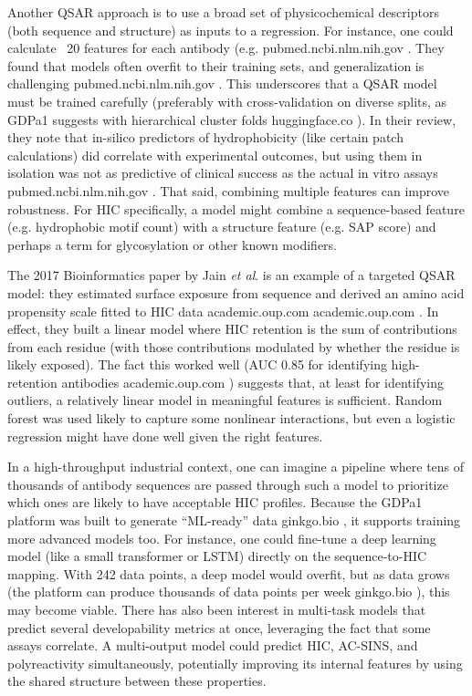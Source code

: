 \documentclass[12pt]{article}
\begin{document}
Another QSAR approach is to use a broad set of physicochemical descriptors (both sequence and structure) as inputs to a regression. For instance, one could calculate ~20 features for each antibody (e.g. %
pubmed.ncbi.nlm.nih.gov
. They found that models often overfit to their training sets, and generalization is challenging
pubmed.ncbi.nlm.nih.gov
. This underscores that a QSAR model must be trained carefully (preferably with cross-validation on diverse splits, as GDPa1 suggests with hierarchical cluster folds
huggingface.co
). In their review, they note that in-silico predictors of hydrophobicity (like certain patch calculations) did correlate with experimental outcomes, but using them in isolation was not as predictive of clinical success as the actual in vitro assays
pubmed.ncbi.nlm.nih.gov
. That said, combining multiple features can improve robustness. For HIC specifically, a model might combine a sequence-based feature (e.g. hydrophobic motif count) with a structure feature (e.g. SAP score) and perhaps a term for glycosylation or other known modifiers.

The 2017 Bioinformatics paper by Jain \textit{et al}. is an example of a targeted QSAR model: they estimated surface exposure from sequence and derived an amino acid propensity scale fitted to HIC data
academic.oup.com
academic.oup.com
. In effect, they built a linear model where HIC retention is the sum of contributions from each residue (with those contributions modulated by whether the residue is likely exposed). The fact this worked well (AUC 0.85 for identifying high-retention antibodies
academic.oup.com
) suggests that, at least for identifying outliers, a relatively linear model in meaningful features is sufficient. Random forest was used likely to capture some nonlinear interactions, but even a logistic regression might have done well given the right features.

In a high-throughput industrial context, one can imagine a pipeline where tens of thousands of antibody sequences are passed through such a model to prioritize which ones are likely to have acceptable HIC profiles. Because the GDPa1 platform was built to generate “ML-ready” data
ginkgo.bio
, it supports training more advanced models too. For instance, one could fine-tune a deep learning model (like a small transformer or LSTM) directly on the sequence-to-HIC mapping. With 242 data points, a deep model would overfit, but as data grows (the platform can produce thousands of data points per week
ginkgo.bio
), this may become viable. There has also been interest in multi-task models that predict several developability metrics at once, leveraging the fact that some assays correlate. A multi-output model could predict HIC, AC-SINS, and polyreactivity simultaneously, potentially improving its internal features by using the shared structure between these properties.
\end{document}
